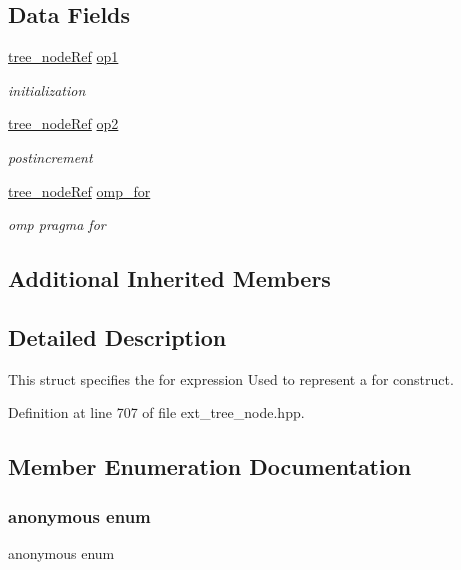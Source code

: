 \subsection*{Data Fields}
\begin{DoxyCompactItemize}
\item 
\hyperlink{tree__node_8hpp_a6ee377554d1c4871ad66a337eaa67fd5}{tree\+\_\+node\+Ref} \hyperlink{structgimple__for_ab90825b9ceb6a03f2f4846ed5fdc6b4c}{op1}
\begin{DoxyCompactList}\small\item\em initialization \end{DoxyCompactList}\item 
\hyperlink{tree__node_8hpp_a6ee377554d1c4871ad66a337eaa67fd5}{tree\+\_\+node\+Ref} \hyperlink{structgimple__for_ae95e121038b3f0a03a4558fad32900c8}{op2}
\begin{DoxyCompactList}\small\item\em postincrement \end{DoxyCompactList}\item 
\hyperlink{tree__node_8hpp_a6ee377554d1c4871ad66a337eaa67fd5}{tree\+\_\+node\+Ref} \hyperlink{structgimple__for_a20199fdf6afef9799e2b01168d4b066a}{omp\+\_\+for}
\begin{DoxyCompactList}\small\item\em omp pragma for \end{DoxyCompactList}\end{DoxyCompactItemize}
\subsection*{Additional Inherited Members}


\subsection{Detailed Description}
This struct specifies the for expression Used to represent a for construct. 

Definition at line 707 of file ext\+\_\+tree\+\_\+node.\+hpp.



\subsection{Member Enumeration Documentation}
\mbox{\label{structgimple__for_a9f1d57e1e9600928ebaad063f76a8c9e}} 
\subsubsection{\texorpdfstring{anonymous enum}{anonymous enum}}
{\footnotesize\ttfamily anonymous enum}



